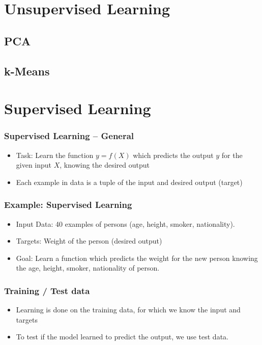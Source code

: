\documentclass[english,final,compress]{beamer}
\begin{document}
\section{Unsupervised Learning}

\subsection{PCA}



\subsection{k-Means}



\section{Supervised Learning}


\begin{frame}
    \frametitle{Supervised Learning -- General}
    \begin{itemize}
	\item Task: Learn the function $ y = f(X) $ which predicts the output $y$ for the given input $X$, knowing the desired output
        \item Each example in data is a tuple of the input and desired output (target)
    \end{itemize}
\end{frame}


\begin{frame}
    \frametitle{Example: Supervised Learning}
    \begin{itemize}
       \item Input Data: 40 examples of persons (age, height, smoker, nationality). 
	\item Targets: Weight of the person (desired output)
	\item Goal: Learn a function which predicts the weight for the new person
		knowing the age, height, smoker, nationality of person.

    \end{itemize}
\end{frame}

\begin{frame}
    \frametitle{Training / Test data}
    \begin{itemize}
	\item Learning is done on the training data, for which we know the input and targets
	\item To test if the model learned to predict the output, we use test data. 		
    \end{itemize}
\end{frame}
\end{document}
